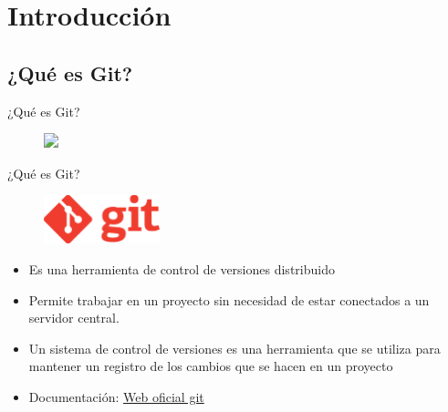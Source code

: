 \documentclass{beamer}
\begin{document}
\begin{frame}








\end{frame}

\section{Introducción} 

\subsection{¿Qué es Git?}

\begin{frame}{¿Qué es Git?}

  \begin{figure}
    \includegraphics<1->[width=0.8\textwidth]{images/cap-one.png}
  \end{figure}


\end{frame}


\begin{frame}{¿Qué es Git?}
  \begin{figure}
    \includegraphics[width = 0.3\textwidth]{images/logo_git.png}
  \end{figure}

  \begin{itemize}[<+->]
    \item Es una herramienta de control de versiones distribuido
    \item Permite trabajar en un proyecto sin necesidad de estar
    conectados a un servidor central.
    \item Un sistema de control de versiones es una herramienta que se utiliza para mantener un registro de los cambios que se hacen en un proyecto
    \item Documentación: \href{https://git-scm.com}{Web oficial git} 
  \end{itemize}

\end{frame}
\end{document}
